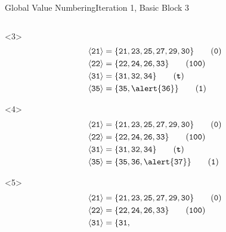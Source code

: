 \documentclass{beamer}
\newcommand{\vn}[1]{\ensuremath{\langle\texttt{#1}\rangle}}
\newcommand{\vreg}[1]{\texttt{#1}}
\begin{document}
\begin{frame}[fragile]{Global Value Numbering}{Iteration 1, Basic Block 3}
\begin{columns}[t,onlytextwidth]
\begin{column}{.5\textwidth}
      \begin{onlyenv}<3>
        \begin{align*}
          \vn{21} &= \{\vreg{21},
                       \vreg{23},
                       \vreg{25},
                       \vreg{27},
                       \vreg{29},
                       \vreg{30}\} \tag{\texttt{0}} \\
          \vn{22} &= \{\vreg{22},
                       \vreg{24},
                       \vreg{26},
                       \vreg{33}\} \tag{\texttt{100}} \\
          \vn{31} &= \{\vreg{31},
                       \vreg{32},
                       \vreg{34}\} \tag{\texttt{\textbf{t}}} \\
          \vn{35} &= \{\vreg{35},
                       \alert{\vreg{36}}\} \tag{\texttt{1}}
        \end{align*}
      \end{onlyenv}
      \begin{onlyenv}<4>
        \begin{align*}
          \vn{21} &= \{\vreg{21},
                       \vreg{23},
                       \vreg{25},
                       \vreg{27},
                       \vreg{29},
                       \vreg{30}\} \tag{\texttt{0}} \\
          \vn{22} &= \{\vreg{22},
                       \vreg{24},
                       \vreg{26},
                       \vreg{33}\} \tag{\texttt{100}} \\
          \vn{31} &= \{\vreg{31},
                       \vreg{32},
                       \vreg{34}\} \tag{\texttt{\textbf{t}}} \\
          \vn{35} &= \{\vreg{35},
                       \vreg{36},
                       \alert{\vreg{37}}\} \tag{\texttt{1}}
        \end{align*}
      \end{onlyenv}
      \begin{onlyenv}<5>
        \begin{align*}
          \vn{21} &= \{\vreg{21},
                       \vreg{23},
                       \vreg{25},
                       \vreg{27},
                       \vreg{29},
                       \vreg{30}\} \tag{\texttt{0}} \\
          \vn{22} &= \{\vreg{22},
                       \vreg{24},
                       \vreg{26},
                       \vreg{33}\} \tag{\texttt{100}} \\
          \vn{31} &= \{\vreg{31},

\end{align*}
\end{onlyenv}
\end{column}
\end{columns}
\end{frame}
\end{document}

